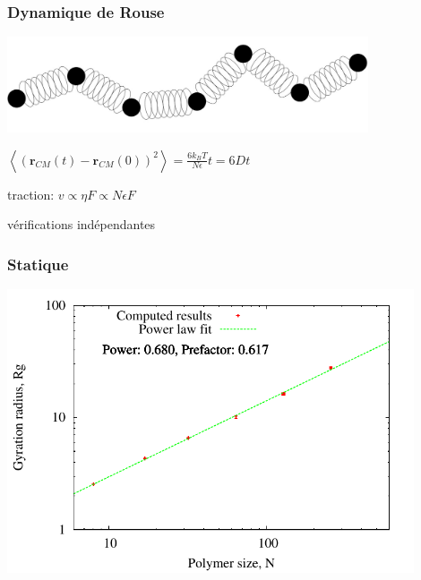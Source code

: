 \documentclass{beamer}
\begin{document}
\frame %
{
  \frametitle{Dynamique de Rouse}
\centering
\includegraphics[width=0.8\textwidth]{rouse.jpg}






\begin{itemize}


\item<2-> \begin{center} $\left<(\textbf{r}_{CM}(t)-\textbf{r}_{CM}(0))^2\right> =\frac{6 k_B T}{N \epsilon} t = 6 D t$
\medskip

\item<3-> traction: $v\propto \eta F \propto N\epsilon F$

\medskip

\item<4-> vérifications indépendantes

\end{center}
\end{itemize}

}



\frame
{\frametitle{Statique}
\centering
 \includegraphics[width=0.9\textwidth]{gyrationradius.pdf}
}


 
\end{document}
